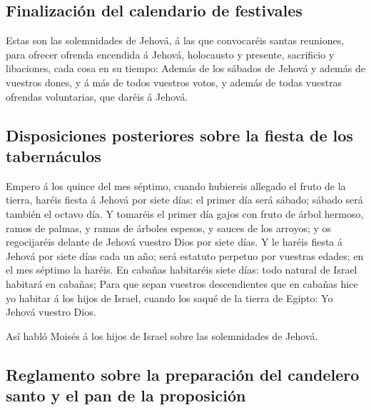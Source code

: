 \hypertarget{finalizaciuxf3n-del-calendario-de-festivales}{%
\subsection{Finalización del calendario de
festivales}\label{finalizaciuxf3n-del-calendario-de-festivales}}

 Estas son las solemnidades de Jehová, á las que
convocaréis santas reuniones, para ofrecer ofrenda encendida á Jehová,
holocausto y presente, sacrificio y libaciones, cada cosa en su tiempo:
 Además de los sábados de Jehová y además de vuestros
dones, y á más de todos vuestros votos, y además de todas vuestras
ofrendas voluntarias, que daréis á Jehová.

\hypertarget{disposiciones-posteriores-sobre-la-fiesta-de-los-tabernuxe1culos}{%
\subsection{Disposiciones posteriores sobre la fiesta de los
tabernáculos}\label{disposiciones-posteriores-sobre-la-fiesta-de-los-tabernuxe1culos}}

 Empero á los quince del mes séptimo, cuando hubiereis
allegado el fruto de la tierra, haréis fiesta á Jehová por siete días:
el primer día será sábado; sábado será también el octavo día.
 Y tomaréis el primer día gajos con fruto de árbol
hermoso, ramos de palmas, y ramas de árboles espesos, y sauces de los
arroyos; y os regocijaréis delante de Jehová vuestro Dios por siete
días.  Y le haréis fiesta á Jehová por siete días cada un
año; será estatuto perpetuo por vuestras edades; en el mes séptimo la
haréis.  En cabañas habitaréis siete días: todo natural
de Israel habitará en cabañas;  Para que sepan vuestros
descendientes que en cabañas hice yo habitar á los hijos de Israel,
cuando los saqué de la tierra de Egipto: Yo Jehová vuestro Dios.

 Así habló Moisés á los hijos de Israel sobre las
solemnidades de Jehová.

\hypertarget{reglamento-sobre-la-preparaciuxf3n-del-candelero-santo-y-el-pan-de-la-proposiciuxf3n}{%
\subsection{Reglamento sobre la preparación del candelero santo y el pan
de la
proposición}\label{reglamento-sobre-la-preparaciuxf3n-del-candelero-santo-y-el-pan-de-la-proposiciuxf3n}}

